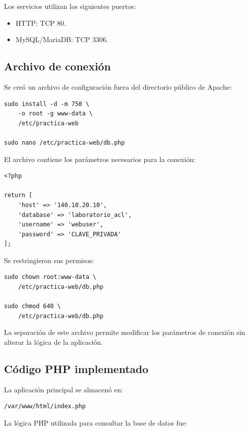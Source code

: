 \documentclass[12pt,a4paper]{article}
\begin{document}
Los servicios utilizan los siguientes
puertos:

\begin{itemize}
    \item HTTP: TCP 80.
    \item MySQL/MariaDB: TCP 3306.
\end{itemize}

\subsection{Archivo de conexión}

Se creó un archivo de configuración
fuera del directorio público de Apache:

\begin{lstlisting}
sudo install -d -m 750 \
    -o root -g www-data \
    /etc/practica-web

sudo nano /etc/practica-web/db.php
\end{lstlisting}

El archivo contiene los parámetros
necesarios para la conexión:

\begin{lstlisting}
<?php

return [
    'host' => '140.10.20.10',
    'database' => 'laboratorio_acl',
    'username' => 'webuser',
    'password' => 'CLAVE_PRIVADA'
];
\end{lstlisting}

Se restringieron sus permisos:

\begin{lstlisting}
sudo chown root:www-data \
    /etc/practica-web/db.php

sudo chmod 640 \
    /etc/practica-web/db.php
\end{lstlisting}

La separación de este archivo
permite modificar los parámetros
de conexión sin alterar
la lógica de la aplicación.

\subsection{Código PHP implementado}

La aplicación principal se almacenó en:

\begin{lstlisting}
/var/www/html/index.php
\end{lstlisting}

La lógica PHP utilizada para
consultar la base de datos fue:
\end{document}
